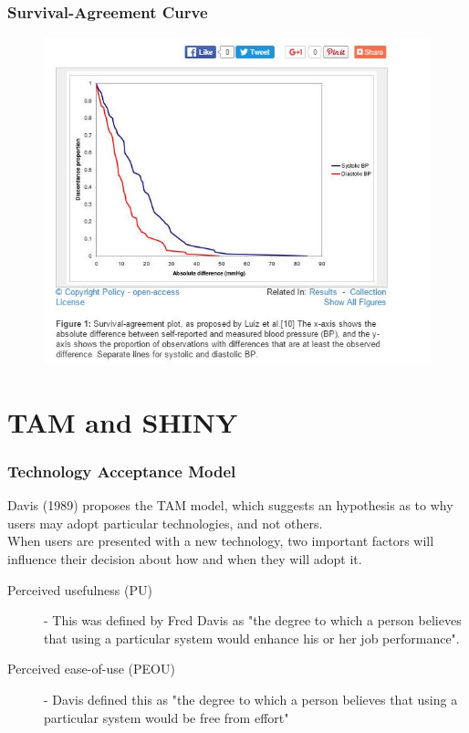 \documentclass[compress]{beamer}        %
\begin{document}
		\begin{frame}
			\frametitle{Survival-Agreement Curve}
\begin{figure}
\centering
\includegraphics[width=0.7\linewidth]{images/SurvivalAgreementPlot}
\caption{}
\label{fig:SurvivalAgreementPlot}
\end{figure}
			
		\end{frame}
		\section{TAM and SHINY}
		\begin{frame}
			\frametitle{Technology Acceptance Model}
			\vspace{-0.4cm}
			Davis (1989) proposes the TAM model, which suggests an hypothesis as to why users may adopt particular technologies, and not others. \\ \bigskip
			When users are presented with a new 
			technology, two important factors will influence their decision about how and when they will adopt it.
			\begin{description}
				\item[Perceived usefulness (PU)] - This was defined by Fred Davis as "the degree to which a person believes that using a particular system would enhance his or her job performance".
				\item[Perceived ease-of-use (PEOU)] - Davis defined this as "the degree to which a person believes that using a particular system would be free from effort" 
			\end{description}
		\end{frame}
		
\end{document}

